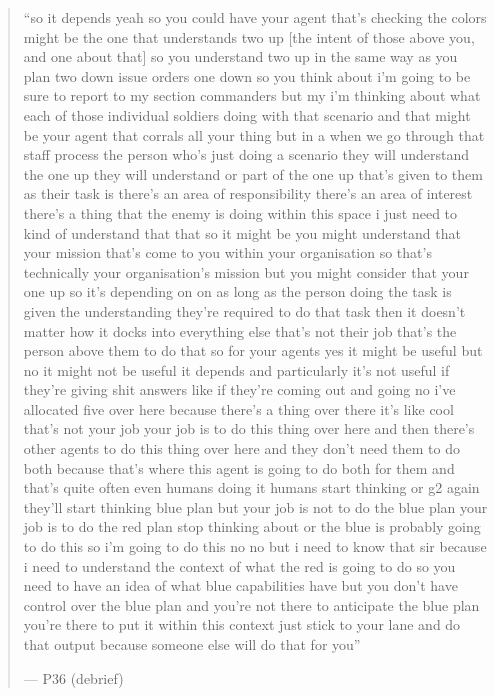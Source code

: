 \begin{quote}
``so it depends yeah so you could have your agent that's checking the colors might be the one that understands two up [the intent of those above you, and one about that] so you understand two up in the same way as you plan two down issue orders one down so you think about i'm going to be sure to report to my section commanders but my i'm thinking about what each of those individual soldiers doing with that scenario and that might be your agent that corrals all your thing but in a when we go through that staff process the person who's just doing a scenario they will understand the one up they will understand or part of the one up that's given to them as their task is there's an area of responsibility there's an area of interest there's a thing that the enemy is doing within this space i just need to kind of understand that that so it might be you might understand that your mission that's come to you within your organisation so that's technically your organisation's mission but you might consider that your one up so it's depending on on as long as the person doing the task is given the understanding they're required to do that task then it doesn't matter how it docks into everything else that's not their job that's the person above them to do that so for your agents yes it might be useful but no it might not be useful it depends and particularly it's not useful if they're giving shit answers like if they're coming out and going no i've allocated five over here because there's a thing over there it's like cool that's not your job your job is to do this thing over here and then there's other agents to do this thing over here and they don't need them to do both because that's where this agent is going to do both for them and that's quite often even humans doing it humans start thinking or g2 again they'll start thinking blue plan but your job is not to do the blue plan your job is to do the red plan stop thinking about or the blue is probably going to do this so i'm going to do this no no but i need to know that sir because i need to understand the context of what the red is going to do so you need to have an idea of what blue capabilities have but you don't have control over the blue plan and you're not there to anticipate the blue plan you're there to put it within this context just stick to your lane and do that output because someone else will do that for you''\par\hfill--- P36 (debrief)
\end{quote}

